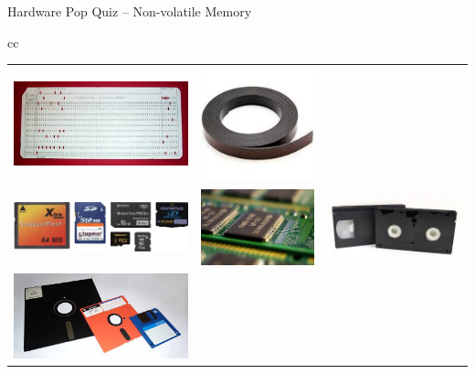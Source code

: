 \documentclass[compress,11pt,xcolor=svgnames,aspectratio=169]{beamer}
\begin{document}
\begin{frame}[fragile] {Hardware Pop Quiz -- Non-volatile Memory}
\begin{center}
\begin{tabular}{cc}
\begin{tabular}{ccc}
\includegraphics[scale=0.2 ]{fig/punch-card} &
\includegraphics[scale=0.2 ]{fig/tape} \\
\includegraphics[scale=0.2 ]{fig/card} &
\includegraphics[scale=0.2 ]{fig/rom} &
\includegraphics[scale=0.2 ]{fig/vhs} \\
\includegraphics[scale=0.2 ]{fig/floppy} &

\end{tabular}
\end{tabular}
\end{center}
\end{frame}
\end{document}
